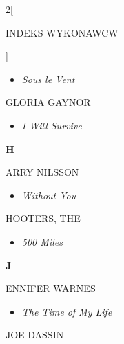 \documentclass[a4paper]{report}
\begin{document}
\begin{multicols*}{2}[\begin{Huge}INDEKS WYKONAWCW\end{Huge}\vspace{1cm}]
\begin{minipage}{\columnwidth}
	\begin{itemize}[topsep=3pt, after=\vspace{3mm}]
		\itemsep0em
		\item[]\textit{Sous le Vent}  \\
	\end{itemize}
\end{minipage}
\begin{minipage}{\columnwidth}
	GLORIA GAYNOR 
	\begin{itemize}[topsep=3pt, after=\vspace{3mm}]
		\itemsep0em
		\item[]\textit{I Will Survive}  \\
	\end{itemize}
\end{minipage}
\begin{minipage}{\columnwidth}
	\begin{Large}\textbf{H}\end{Large}ARRY NILSSON 
	\begin{itemize}[topsep=3pt, after=\vspace{3mm}]
		\itemsep0em
		\item[]\textit{Without You}  \\
	\end{itemize}
\end{minipage}
\begin{minipage}{\columnwidth}
	HOOTERS, THE 
	\begin{itemize}[topsep=3pt, after=\vspace{3mm}]
		\itemsep0em
		\item[]\textit{500 Miles}  \\
	\end{itemize}
\end{minipage}
\begin{minipage}{\columnwidth}
	\begin{Large}\textbf{J}\end{Large}ENNIFER WARNES 
	\begin{itemize}[topsep=3pt, after=\vspace{3mm}]
		\itemsep0em
		\item[]\textit{The Time of My Life}  \\
	\end{itemize}
\end{minipage}
\begin{minipage}{\columnwidth}
	JOE DASSIN 
	\begin{itemize}[topsep=3pt, after=\vspace{3mm}]

\end{itemize}
\end{minipage}
\end{multicols*}
\end{document}
